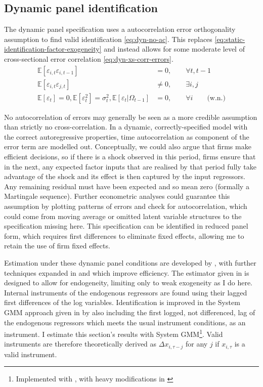 \subsection{Dynamic panel identification}

The dynamic panel specification uses a autocorrelation error orthogonality assumption
to find valid identification \eqref{eq:dyn-no-ac}.
This replaces \eqref{eq:static-identification-factor-exogeneity} and instead allows
for some moderate level of cross-sectional error correlation \eqref{eq:dyn-xs-corr-errors}.
\begin{align}
    \label{eq:dyn-no-ac}
    \mathbb E[\varepsilon_{i,t}\varepsilon_{i,t-1}] &= 0       ,\qquad \forall t,t-1
    \\
    \label{eq:dyn-xs-corr-errors}
    \mathbb E[\varepsilon_{i,t}\varepsilon_{j,t}] &\neq 0   ,\qquad \exists i,j
    \\
    \label{eq:dyn-error-wn}
    \mathbb E[\varepsilon_t]    =0,
    \mathbb E[\varepsilon_t^2]  =\sigma_t^2,
    \mathbb E[\varepsilon_t|\Omega_{t-1}] &=0                  ,\qquad \forall i
    \qquad\text{(w.n.)}
\end{align}

No autocorrelation of errors may generally be seen as a more credible assumption
than strictly no cross-correlation.
In a dynamic, correctly-specified model with the correct autoregressive properties,
time autocorrelation as component of the error term are modelled out.
Conceptually, we could also argue that firms make efficient decisions,
so if there is a shock observed in this period, firms ensure that in the next,
any expected factor inputs that are realised by that period fully take advantage of the shock
and its effect is then captured by the input regressors.
Any remaining residual must have been expected and so mean zero (formally a Martingale sequence).
Further econometric analyses could guarantee this assumption by plotting patterns of errors
and check for autocorrelation, which could come from moving average
or omitted latent variable structures to the specification missing here.
This specification can be identified in reduced panel form,
which requires first differences to eliminate fixed effects,
allowing me to retain the use of firm fixed effects.
\par
Estimation under these dynamic panel conditions are developed by \cite{Anderson1981},
with further techniques expanded in \cite{Arellano1991} and \cite{Blundell1998} which improve efficiency.
The estimator given in \cite{Arellano1991} is designed to allow for
endogeneity, limiting only to weak exogeneity as I do here.
Internal instruments of the endogenous regressors are found using their lagged first differences of the log variables.
Identification is improved in the System GMM approach given in \cite{Blundell1998}
by also including the first logged, not differenced, lag of the endogenous regressors
which meets the usual instrument conditions, as an instrument.
I estimate this section's results with
System GMM\footnote{Implemented with \cite{Wu2023}, with heavy modifications in \cite{Lip2026}}.
Valid instruments are therefore theoretically derived as $\Delta x_{i,\tau-j}$ for any $j$
if $x_{i,\tau}$ is a valid instrument.

